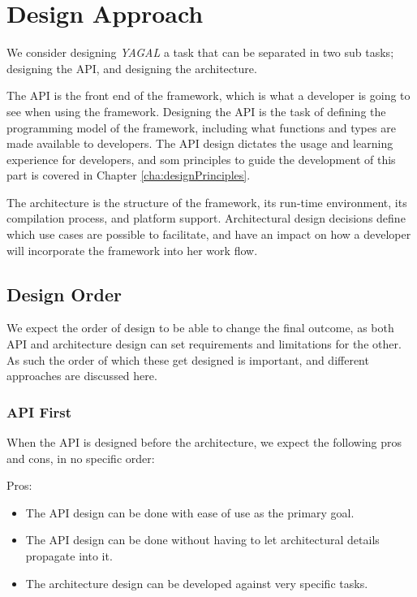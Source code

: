 \section{Design Approach}
We consider designing \textit{YAGAL} a task that can be separated in two sub tasks; designing the API, and designing the architecture.

The API is the front end of the framework, which is what a developer is going to see when using the framework. Designing the API is the task of defining the programming model of the framework, including what functions and types are made available to developers. The API design dictates the usage and learning experience for developers, and som principles to guide the development of this part is covered in Chapter \ref{cha:designPrinciples}.

The architecture is the structure of the framework, its run-time environment, its compilation process, and platform support. Architectural design decisions define which use cases are possible to facilitate, and have an impact on how a developer will incorporate the framework into her work flow.

\subsection{Design Order}
We expect the order of design to be able to change the final outcome, as both API and architecture design can set requirements and limitations for the other. As such the order of which these get designed is important, and different approaches are discussed here.

\subsubsection{API First}
When the API is designed before the architecture, we expect the following pros and cons, in no specific order:

Pros:
\begin{itemize}
\item The API design can be done with ease of use as the primary goal.
\item The API design can be done without having to let architectural details propagate into it.
\item The architecture design can be developed against very specific tasks.
\end{itemize}

